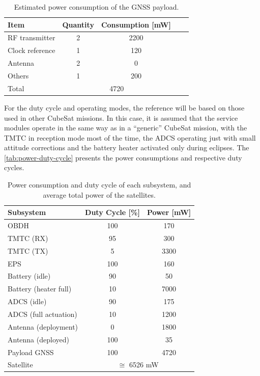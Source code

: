 \begin{table}[!ht]
    \centering
    \begin{tabular}{lcccc}
        \toprule[1.5pt]
        \textbf{Item} & \textbf{Quantity} & \textbf{Consumption [mW]} \\
        \midrule
        RF transmitter  & 2 & 2200 \\
        Clock reference & 1 & 120 \\
        Antenna         & 2 & 0 \\
        Others          & 1 & 200 \\
        \cmidrule{2-3}
        Total           & \multicolumn{2}{c}{4720} \\
        \bottomrule[1.5pt]
    \end{tabular}
    \caption{Estimated power consumption of the GNSS payload.}
    \label{tab:power-gnss-payload}
\end{table}

For the duty cycle and operating modes, the reference will be based on those used in other CubeSat missions. In this case, it is assumed that the service modules operate in the same way as in a ``generic'' CubeSat mission, with the TMTC in reception mode most of the time, the ADCS operating just with small attitude corrections and the battery heater activated only during eclipses. The \autoref{tab:power-duty-cycle} presents the power consumptions and respective duty cycles.

\begin{table}[!ht]
    \centering
    \begin{tabular}{lcc}
        \toprule[1.5pt]
        \textbf{Subsystem} & \textbf{Duty Cycle [\%]} & \textbf{Power [mW]} \\
        \midrule
        OBDH                  & 100 & 170 \\
        TMTC (RX)             & 95  & 300 \\
        TMTC (TX)             & 5   & 3300 \\
        EPS                   & 100 & 160 \\
        Battery (idle)        & 90  & 50 \\
        Battery (heater full) & 10  & 7000 \\
        ADCS (idle)           & 90  & 175 \\
        ADCS (full actuation) & 10  & 1200 \\
        Antenna (deployment)  & 0   & 1800 \\
        Antenna (deployed)    & 100 & 35 \\
        Payload GNSS          & 100 & 4720 \\
        \cmidrule{2-3}
        Satellite             & \multicolumn{2}{c}{$\cong$ 6526 mW} \\
        \bottomrule[1.5pt]
    \end{tabular}
    \caption{Power consumption and duty cycle of each subsystem, and average total power of the satellites.}
    \label{tab:power-duty-cycle}
\end{table}

